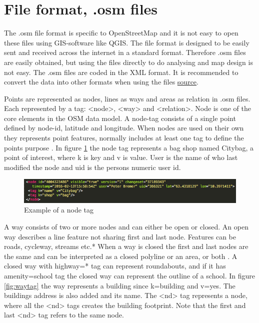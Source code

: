 

 \section{File format, .osm files}
The .osm file format is specific to OpenStreetMap and it is not easy to open these files using GIS-software like QGIS. The file format is designed to be easily sent and received across the internet in a standard format. Therefore .osm files are easily obtained, but using the files directly to do analysing and map design is not easy. The .osm files are coded in the XML format. It is recommended to convert the data into other formats when using the files \href{http://learnosm.org/en/osm-data/file-formats/}{source}. 

Points are represented as nodes, lines as ways and areas as relation in .osm files. Each represented by a tag: <node>, <way> and <relation>. Node is one of the core elements in the OSM data model. A node-tag consists of a single point defined by node-id, latitude and longitude. When nodes are used on their own they represents point features, normally includes at least one tag to define the points purpose \cite{OpenStreetMapc}. In figure \ref{fig:nodetag} the node tag represents a bag shop named Citybag, a point of interest, where k is key and v is value. User is the name of who last modified the node and uid is the persons numeric user id.  

\begin{figure}[H]
    \centering
    \includegraphics[scale=0.6]{figures/FixedByMe/node_tag.png}
    \caption{Example of a node tag}
    \label{fig:nodetag}
\end{figure} 

A way consists of two or more nodes and can either be open or closed. An open way describes a line feature not sharing first and last node. Features can be roads, cycleway, streams etc.* %
When a way is closed the first and last nodes are the same and can be interpreted as a closed polyline or an area, or both \cite{OpenStreetMapd}. A closed way with highway=* tag can represent roundabouts, and if it has amenity=school tag the closed way can represent the outline of a school. In figure \ref{fig:waytag} the way represents a building since k=building and v=yes. The buildings address is also added and its name. The <nd> tag represents a node, where all the <nd> tags creates the building footprint. Note that the first and last <nd> tag refers to the same node. 

